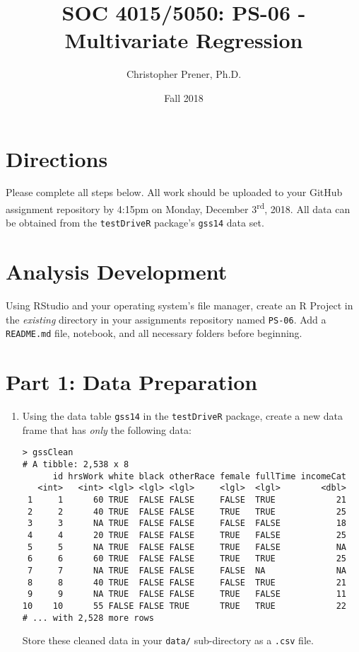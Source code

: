 \documentclass{tufte-handout}
\title{SOC 4015/5050: PS-06 - Multivariate Regression}
\author{Christopher Prener, Ph.D.}
\date{Fall 2018}
\begin{document}

\maketitle %


\vspace{5mm}
\section{Directions}
Please complete all steps below. All work should be uploaded to your GitHub assignment repository by 4:15pm on Monday, December 3\textsuperscript{rd}, 2018. All data can be obtained from the \texttt{testDriveR} package's \texttt{gss14} data set.

\vspace{5mm}
\section{Analysis Development}
Using RStudio and your operating system's file manager, create an R Project in the \textit{existing} directory in your assignments repository named \texttt{PS-06}. Add a \texttt{README.md} file, notebook, and all necessary folders before beginning.

\vspace{5mm}
\section{Part 1: Data Preparation}
\begin{enumerate}
\item Using the data table \texttt{gss14} in the \texttt{testDriveR} package, create a new data frame that has \textit{only} the following data:
\begin{verbatim}
> gssClean
# A tibble: 2,538 x 8
      id hrsWork white black otherRace female fullTime incomeCat
   <int>   <int> <lgl> <lgl> <lgl>     <lgl>  <lgl>        <dbl>
 1     1      60 TRUE  FALSE FALSE     FALSE  TRUE            21
 2     2      40 TRUE  FALSE FALSE     TRUE   TRUE            25
 3     3      NA TRUE  FALSE FALSE     FALSE  FALSE           18
 4     4      20 TRUE  FALSE FALSE     TRUE   FALSE           25
 5     5      NA TRUE  FALSE FALSE     TRUE   FALSE           NA
 6     6      60 TRUE  FALSE FALSE     TRUE   TRUE            25
 7     7      NA TRUE  FALSE FALSE     FALSE  NA              NA
 8     8      40 TRUE  FALSE FALSE     FALSE  TRUE            21
 9     9      NA TRUE  FALSE FALSE     TRUE   FALSE           11
10    10      55 FALSE FALSE TRUE      TRUE   TRUE            22
# ... with 2,528 more rows
\end{verbatim}

Store these cleaned data in your \texttt{data/} sub-directory as a \texttt{.csv} file.
\end{enumerate}
\end{document}
